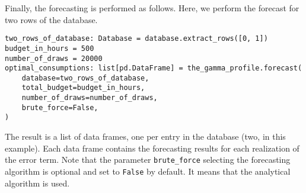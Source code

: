 \documentclass[12pt,a4paper]{article}
\begin{document}
Finally, the forecasting is performed as follows. Here, we perform the forecast for two rows of the database.
\begin{center}
         \begin{lstlisting}
two_rows_of_database: Database = database.extract_rows([0, 1])
budget_in_hours = 500
number_of_draws = 20000
optimal_consumptions: list[pd.DataFrame] = the_gamma_profile.forecast(
    database=two_rows_of_database,
    total_budget=budget_in_hours,
    number_of_draws=number_of_draws,
    brute_force=False,
)
          \end{lstlisting}
     \end{center}
The result is a list of data frames, one per entry in the database (two, in this example). Each data frame contains
the forecasting results for each realization of the error term. Note that the parameter \lstinline{brute_force} selecting the forecasting algorithm is
optional and set to \lstinline{False} by default. It means that the analytical algorithm is used.




\end{document}
